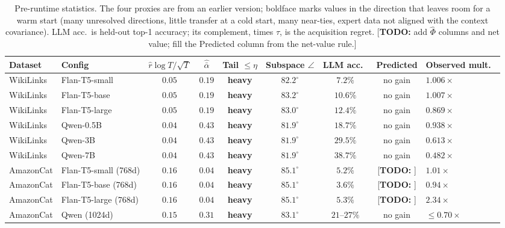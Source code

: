 \documentclass{article}
\theoremstyle{definition}
\theoremstyle{remark}
\theoremstyle{remark}
\newcommand{\todo}[1]{\textcolor{red!70!black}{[\textbf{TODO:} #1]}}
\begin{document}
\begin{table}[h]
\centering
\caption{Pre-runtime statistics. The four proxies are from an earlier
version; boldface marks values in the direction that leaves room for a
warm start (many unresolved directions, little transfer at a cold start,
many near-ties, expert data not aligned with the context covariance). LLM
acc.\ is held-out top-1 accuracy; its complement, times $\tau$, is the
acquisition regret. \todo{add $\widehat\Phi$ columns and net value; fill
the Predicted column from the net-value rule.}}
\label{tab:diagnostics}
\scriptsize
\setlength{\tabcolsep}{3pt}
\begin{tabular}{@{}llccccccl@{}}
\toprule
Dataset & Config & $\widehat r\log T/\sqrt T$ & $\widehat{\bar\alpha}$ & Tail $\le\eta$ & Subspace $\angle$ & LLM acc.\ & Predicted & Observed mult.\ \\
\midrule
WikiLinks & Flan-T5-small  & $0.05$ & $0.19$ & \textbf{heavy} & $\mathbf{82.2^\circ}$ & $7.2\%$ & no gain & $1.006\times$ \\
WikiLinks & Flan-T5-base   & $0.05$ & $0.19$ & \textbf{heavy} & $\mathbf{83.2^\circ}$ & $10.6\%$ & no gain & $1.007\times$ \\
WikiLinks & Flan-T5-large  & $0.05$ & $0.19$ & \textbf{heavy} & $\mathbf{83.0^\circ}$ & $12.4\%$ & no gain & $0.869\times$ \\
WikiLinks & Qwen-0.5B      & $0.04$ & $0.43$ & \textbf{heavy} & $\mathbf{81.9^\circ}$ & $18.7\%$ & no gain & $0.938\times$ \\
WikiLinks & Qwen-3B        & $0.04$ & $0.43$ & \textbf{heavy} & $\mathbf{81.9^\circ}$ & $29.5\%$ & no gain & $0.613\times$ \\
WikiLinks & Qwen-7B        & $0.04$ & $0.43$ & \textbf{heavy} & $\mathbf{81.9^\circ}$ & $38.7\%$ & no gain & $0.482\times$ \\
\midrule
AmazonCat & Flan-T5-small (768d) & $\mathbf{0.16}$ & $\mathbf{0.04}$ & \textbf{heavy} & $\mathbf{85.1^\circ}$ & $5.2\%$ & \todo{} & $1.01\times$ \\
AmazonCat & Flan-T5-base (768d)  & $\mathbf{0.16}$ & $\mathbf{0.04}$ & \textbf{heavy} & $\mathbf{85.1^\circ}$ & $3.6\%$ & \todo{} & $0.94\times$ \\
AmazonCat & Flan-T5-large (768d) & $\mathbf{0.16}$ & $\mathbf{0.04}$ & \textbf{heavy} & $\mathbf{85.1^\circ}$ & $5.3\%$ & \todo{} & $\mathbf{2.34\times}$ \\
AmazonCat & Qwen (1024d)   & $\mathbf{0.15}$ & $0.31$ & \textbf{heavy} & $\mathbf{83.1^\circ}$ & $21$--$27\%$ & no gain & $\le0.70\times$ \\
\bottomrule
\end{tabular}
\end{table}
\end{document}
